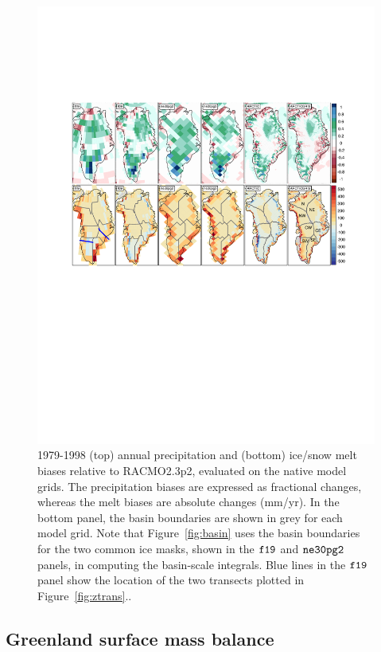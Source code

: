 \documentclass[draft]{agujournal2019}
\begin{document}
\begin{figure}[t]
\begin{center}
         \includegraphics[width=130mm]{figs/temp_contours_diffRACMO}
\end{center}
\caption{1979-1998 (top) annual precipitation and (bottom) ice/snow melt biases relative to RACMO2.3p2, evaluated on the native model grids. The precipitation biases are expressed as fractional changes, whereas the melt biases are absolute changes (mm/yr). In the bottom panel, the  basin boundaries are shown in grey for each model grid. Note that Figure~\ref{fig:basin} uses the basin boundaries for the two common ice masks, shown in the $\tt f19$ and $\tt ne30pg2$ panels, in computing the basin-scale integrals. Blue lines in the $\tt f19$ panel show the location of the two transects plotted in Figure~\ref{fig:ztrans}..}
\label{fig:prect}
\end{figure}

\subsection{Greenland surface mass balance}
\end{document}
